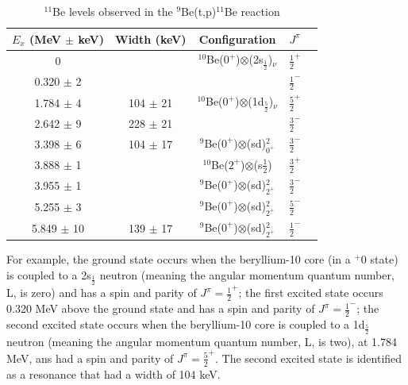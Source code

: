 \documentclass[11pt]{article} %
\begin{document}
\begin{table}[ht] 
\caption{$^{11}$Be levels observed in the $^{9}$Be(t,p)$^{11}$Be reaction}%
\centering %
\begin{tabular}{c c c c c} %
\hline\hline %
$E_{x}$ (MeV $\pm$ keV) & Width (keV) & Configuration & $J^{\pi}$ \\ [0.5ex] %
\hline %
0                           &                           & $^{10}$Be($0^{+}$)$\otimes$(2s$_{\frac{1}{2}}$)$_{\nu}$ & $\frac{1}{2}^{+}$ \\ [1ex] %
0.320 $\pm$ 2   &                           &                                                                                                         & $\frac{1}{2}^{-}$ \\ [1ex]
1.784 $\pm$ 4   & 104 $\pm$ 21 & $^{10}$Be($0^{+}$)$\otimes$(1d$_{\frac{5}{2}}$)$_{\nu}$ & $\frac{5}{2}^{+}$ \\ [1ex]
2.642 $\pm$ 9   & 228 $\pm$ 21 &                                                                                                         & $\frac{3}{2}^{-}$ \\ [1ex]
3.398 $\pm$ 6   & 104 $\pm$ 17 & $^{9}$Be($0^{+}$)$\otimes$(sd)$^{2}_{0^{+}}$                    & $\frac{3}{2}^{-}$ \\ [1ex]
3.888 $\pm$ 1   &                           & $^{10}$Be($2^{+}$)$\otimes$(s$\frac{1}{2}$)                        & $\frac{3}{2}^{+}$ \\ [1ex] 
3.955 $\pm$ 1   &                           & $^{9}$Be($0^{+}$)$\otimes$(sd)$^{2}_{2^{+}}$                    & $\frac{3}{2}^{-}$ \\ [1ex]  
5.255 $\pm$ 3   &                           & $^{9}$Be($0^{+}$)$\otimes$(sd)$^{2}_{2^{+}}$                    & $\frac{5}{2}^{-}$ \\ [1ex]
5.849 $\pm$ 10 & 139 $\pm$ 17 & $^{9}$Be($0^{+}$)$\otimes$(sd)$^{2}_{2^{+}}$                    & $\frac{1}{2}^{-}$ \\ [1ex] %
\hline %
\end{tabular} 
\label{table:nonlin} %
\end{table} 

For example, the ground state occurs when the beryllium-10 core (in a $^+0$ state) is coupled to a 2s$_\frac{1}{2}$ neutron (meaning the angular momentum quantum number, L, is zero) and has a spin and parity of $J^{\pi}=\frac{1}{2}^{+}$; the first excited state occurs 0.320 MeV above the ground state and has a spin and parity of $J^{\pi}=\frac{1}{2}^{-}$; the second excited state occurs when the beryllium-10 core is coupled to a 1d$_{\frac{5}{2}}$ neutron (meaning the angular momentum quantum number, L, is two), at 1.784 MeV, ans had a spin and parity of $J^{\pi}=\frac{5}{2}^{+}$. The second excited state is identified as a resonance that had a width of 104 keV.
\end{document}
